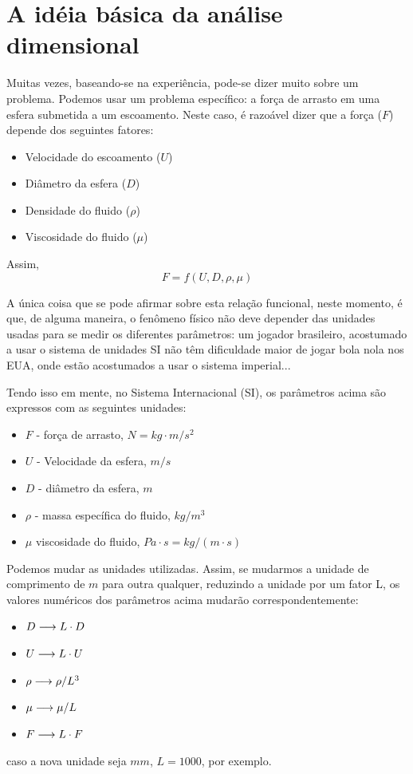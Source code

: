 \section{A idéia básica da análise dimensional}
Muitas vezes, baseando-se na experiência, pode-se dizer muito sobre um problema. Podemos usar um problema específico: a força de arrasto em uma esfera submetida a um escoamento. Neste caso, é razoável dizer que a força ($F$) depende dos seguintes fatores:
\begin{itemize}
\item Velocidade do escoamento ($U$)
\item Diâmetro da esfera ($D$)
\item Densidade do fluido ($\rho$)
\item Viscosidade do fluido ($\mu$)
\end{itemize}

Assim,
\[
F = f(U, D, \rho, \mu)
\]

A única coisa que se pode afirmar sobre esta relação funcional, neste momento, é que, de alguma maneira, o fenômeno físico não deve depender das unidades usadas para se medir os diferentes parâmetros: um jogador brasileiro, acostumado a usar o sistema de unidades SI não têm dificuldade maior de jogar bola nola nos EUA, onde estão acostumados a usar o sistema imperial...

Tendo isso em mente, no Sistema Internacional (SI), os parâmetros acima são expressos com as seguintes unidades:

\begin{itemize}
\item $F$ - força de arrasto, $N=kg\cdot m/s^2$
\item $U$ - Velocidade da esfera, $m/s$
\item $D$ - diâmetro da esfera, $m$
\item $\rho$ - massa específica do fluido, $kg/m^3$
\item $\mu$ viscosidade do fluido, $Pa\cdot s = kg/(m\cdot s)$
\end{itemize}

Podemos mudar as unidades utilizadas. Assim, se mudarmos a unidade de comprimento de $m$ para outra qualquer, reduzindo a unidade por um fator L, os valores numéricos dos parâmetros acima mudarão correspondentemente:
\begin{itemize}
\item $D \longrightarrow L \cdot D$
\item $U \longrightarrow L \cdot U$
\item $\rho \longrightarrow  \rho / L^3$
\item $\mu \longrightarrow \mu / L$
\item $F \longrightarrow L \cdot F$
\end{itemize}
caso a nova unidade seja $mm$, $L = 1000$, por exemplo.

